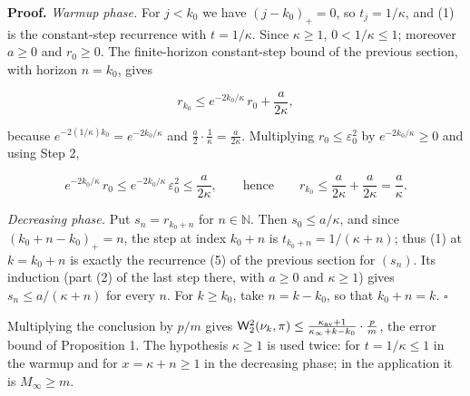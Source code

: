 \documentclass[11pt,a4paper]{article}
\begin{document}
\textbf{Proof.} \emph{Warmup phase.} For \(j<k_0\) we have \((j-k_0)_+=0\), so \(t_j=1/\kappa\), and (1) is the constant-step recurrence with \(t=1/\kappa\). Since \(\kappa\ge1\), \(0<1/\kappa\le1\); moreover \(a\ge0\) and \(r_0\ge0\). The finite-horizon constant-step bound of the previous section, with horizon \(n=k_0\), gives


\[r_{k_0}\le e^{-2k_0/\kappa}\,r_0+\frac a{2\kappa},\]


because \(e^{-2(1/\kappa)k_0}=e^{-2k_0/\kappa}\) and \(\frac a2\cdot\frac1\kappa=\frac a{2\kappa}\). Multiplying \(r_0\le\varepsilon_0^2\) by \(e^{-2k_0/\kappa}\ge0\) and using Step 2,


\[e^{-2k_0/\kappa}\,r_0\le e^{-2k_0/\kappa}\,\varepsilon_0^2\le\frac a{2\kappa},\qquad\text{hence}\qquad r_{k_0}\le\frac a{2\kappa}+\frac a{2\kappa}=\frac a\kappa.\]


\emph{Decreasing phase.} Put \(s_n=r_{k_0+n}\) for \(n\in\mathbb N\). Then \(s_0\le a/\kappa\), and since \((k_0+n-k_0)_+=n\), the step at index \(k_0+n\) is \(t_{k_0+n}=1/(\kappa+n)\); thus (1) at \(k=k_0+n\) is exactly the recurrence (5) of the previous section for \((s_n)\). Its induction (part (2) of the last step there, with \(a\ge0\) and \(\kappa\ge1\)) gives \(s_n\le a/(\kappa+n)\) for every \(n\). For \(k\ge k_0\), take \(n=k-k_0\), so that \(k_0+n=k\). \(\square\)




Multiplying the conclusion by \(p/m\) gives \(\mathsf W_2^2(\nu_k,\pi)\le\frac{\kappa_{\rm av}+1}{\kappa_\infty+k-k_0}\cdot\frac pm\), the error bound of Proposition 1. The hypothesis \(\kappa\ge1\) is used twice: for \(t=1/\kappa\le1\) in the warmup and for \(x=\kappa+n\ge1\) in the decreasing phase; in the application it is \(M_\infty\ge m\).
\end{document}
